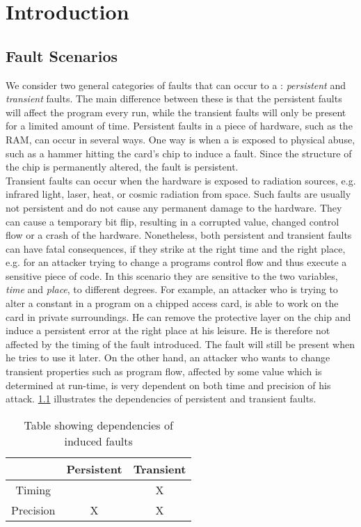 \chapter{Introduction}
\section{Fault Scenarios}
We consider two general categories of faults that can occur to a \jc: \textit{persistent} and \textit{transient} faults. The main difference between these is that the persistent faults will affect the program every run, while the transient faults will only be present for a limited amount of time.
Persistent faults in a piece of hardware, such as the RAM, can occur in several ways. One way is when a \jc is exposed to physical abuse, such as a hammer hitting the card's chip to induce a fault. Since the structure of the chip is permanently altered, the fault is persistent.\\


Transient faults can occur when the hardware is exposed to radiation sources, e.g. infrared light, laser, heat, or cosmic radiation from space. Such faults are usually not persistent and do not cause any permanent damage to the hardware. They can cause a temporary bit flip, resulting in a corrupted value, changed control flow or a crash of the hardware.
Nonetheless, both persistent and transient faults can have fatal consequences, if they strike at the right time and the right place, e.g. for an attacker trying to change a programs control flow and thus execute a sensitive piece of code. In this scenario they are sensitive to the two variables, \textit{time} and \textit{place}, to different degrees. For example, an attacker who is trying to alter a constant in a program on a chipped access card, is able to work on the card in private surroundings. He can remove the protective layer on the chip and induce a persistent error at the right place at his leisure. He is therefore not affected by the timing of the fault introduced. The fault will still be present when he tries to use it later. On the other hand, an attacker who wants to change transient properties such as program flow, affected by some value which is determined at run-time, is very dependent on both time and precision of his attack. \cref{tab:dependencies} illustrates the dependencies of persistent and transient faults.

\begin{table}[h!]
\centering
\begin{tabular}{|c|c|c|}
\hline  & Persistent & Transient \\ 
\hline Timing &  & X \\ 
\hline Precision & X & X \\ 
\hline 
\end{tabular} 
\caption{Table showing dependencies of induced faults}
\label{tab:dependencies}
\end{table}

